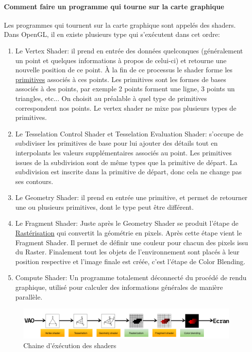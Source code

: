 \documentclass[a4paper,10pt]{article}
\begin{document}
\paragraph{Comment faire un programme qui tourne sur la carte graphique}
Les programmes qui tournent sur la carte graphique sont appelés des shaders. Dans OpenGL, il en existe plusieurs type qui s'exécutent dans cet ordre:
\begin{enumerate}
 \item Le Vertex Shader: il prend en entrée des données quelconques (généralement un point et quelques informations à propos de celui-ci) et retourne une nouvelle position de ce point. À la fin de ce processus le shader forme les \hyperref[subsubsec:Primitives]{primitives} associés à ces points. Les primitives sont les formes de bases associés à des points, par exemple 2 points forment une ligne, 3 points un triangles, etc... On choisit au préalable à quel type de primitives correspondent nos points. Le vertex shader ne mixe pas plusieurs types de primitives.
 \item Le Tesselation Control Shader et Tesselation Evaluation Shader: s'occupe de subdiviser les primitives de base pour lui ajouter des détails tout en interpolants les valeurs supplémentaires associés au point. Les primitives issues de la subdivision sont de même types que la primitive de départ. La subdivision est inscrite dans la primitive de départ, donc cela ne change pas ses contours.
 \item Le Geometry Shader: il prend en entrée une primitive, et permet de retourner une ou plusieurs primitives, dont le type peut être différent.
 \item Le Fragment Shader: Juste après le Geometry Shader se produit l'étape de \href{https://fr.wikipedia.org/wiki/Rast\%C3\%A9risation}{Rastérisation} qui convertit la géométrie en pixels. Après cette étape vient le Fragment Shader. Il permet de définir une couleur pour chacun des pixels issu du Raster. Finalement tout les objets de l'environnement sont placés à leur position respective et l'image finale est créée, c'est l'étape de Color Blending.
 \item Compute Shader: Un programme totalement déconnecté du procédé de rendu graphique, utilisé pour calculer des informations générales de manière parallèle.
\end{enumerate}


\begin{figure}[h]
    \centering
    \includegraphics[width=1\textwidth]{shader_pipeline_sideways}
    \caption{Chaine d'éxécution des shaders}
\end{figure}
\end{document}
